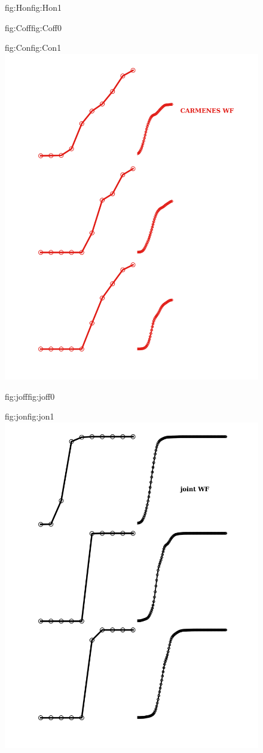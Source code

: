 \begin{figure}
\begin{ocg}{fig:Hon}{fig:Hon}{1}
  \end{ocg}
  \hspace{-0.8\hsize}%
  \begin{ocg}{fig:Coff}{fig:Coff}{0}%
  \end{ocg}%
  \begin{ocg}{fig:Con}{fig:Con}{1}%
  \includegraphics[width=0.8\hsize]{figures/9vKcNrv_carmenes.png}%
  \end{ocg}
  \hspace{-0.8\hsize}%
  \begin{ocg}{fig:joff}{fig:joff}{0}%
  \end{ocg}%
  \begin{ocg}{fig:jon}{fig:jon}{1}%
  \includegraphics[width=0.8\hsize]{figures/9vKcNrv_joint.png}%

\end{ocg}
\end{figure}

